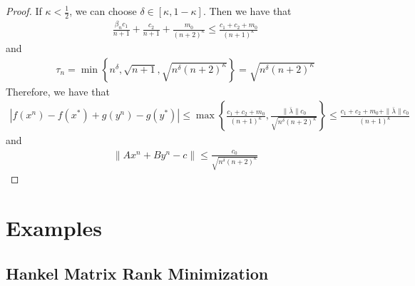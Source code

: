\documentclass{article}
\numberwithin{equation}{section}
\begin{document}
\begin{proof}
    If $\kappa < \frac{1}{2}$, we can choose $\delta \in [\kappa, 1-\kappa] $. Then we have that
    \begin{align}
        \frac{\beta_nc_1}{n+1} + \frac{c_2}{n+1}  +\frac{m_0}{(n+2)^{\kappa}} \leq \frac{c_1+c_2+m_0}{(n+1)^{\kappa}}
    \end{align}
    and
    \begin{align}
        \tau_n = \min\left\{ n^{\delta}, \sqrt{n+1}, \sqrt{n^{\delta}(n+2)^{\kappa}} \right\} 
        =\sqrt{n^{\delta}(n+2)^{\kappa}} \nonumber
    \end{align}
    Therefore, we have that
    \begin{align}
        \left|f(x^n) -f(x^*) + g(y^n) -g(y^*)\right| \leq \max\left\{\frac{c_1+c_2+m_0}{(n+1)^{\kappa}}, 
        \frac{\|\bar{\lambda}\rVert c_0}{\sqrt{n^{\delta}(n+2)^{\kappa}}} \right\} \leq 
        \frac{c_1+c_2+m_0+\|\bar{\lambda}\rVert c_0}{(n+1)^{\kappa}}
    \end{align}
    and
    \begin{align}
        \|Ax^n +By^n - c\rVert \leq \frac{c_0}{\sqrt{n^{\delta}(n+2)^{\kappa}}}
    \end{align}
\end{proof}




\section{Examples}
\subsection{Hankel Matrix Rank Minimization}
\end{document}
